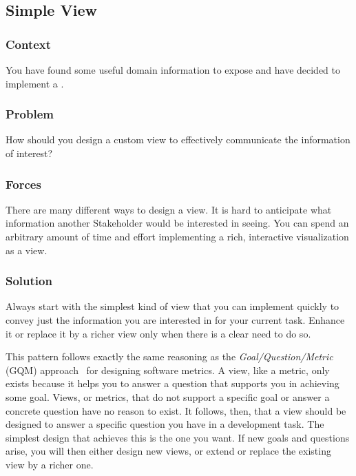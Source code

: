 \documentclass[sigconf]{acmart}
\newcommand{\pattern}[1]{\emph{\nameref{pat:#1}}\xspace}
\begin{document}
\subsection*{Simple View}\label{pat:simpleView}

\subsubsection*{Context}
You have found some useful domain information to expose and have decided to implement a \pattern{customView}.

\subsubsection*{Problem}
How should you design a custom view to effectively communicate the information of interest?

\subsubsection*{Forces}
There are many different ways to design a view.
It is hard to anticipate what information another Stakeholder would be interested in seeing.
You can spend an arbitrary amount of time and effort implementing a rich, interactive visualization as a view.

\subsubsection*{Solution}
Always start with the simplest kind of view that you can implement quickly to convey just the information you are interested in for your current task.
Enhance it or replace it by a richer view only when there is a clear need to do so.

This pattern follows exactly the same reasoning as the \emph{Goal/Question/Metric} (GQM) approach~\cite{Basi94a} for designing software metrics.
A view, like a metric, only exists because it helps you to answer a question that supports you in achieving some goal.
Views, or metrics, that do not support a specific goal or answer a concrete question have no reason to exist.
It follows, then, that a view should be designed to answer a specific question you have in a development task.
The simplest design that achieves this is the one you want.
If new goals and questions arise, you will then either design new views, or extend or replace the existing view by a richer one.
\end{document}
